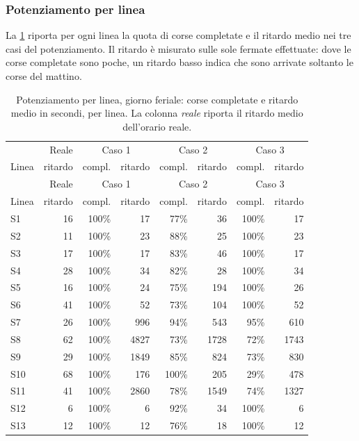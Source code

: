 \subsubsection{Potenziamento per linea}
La \cref{tab:linee-potenziamento} riporta per ogni linea la quota di corse completate e il ritardo medio nei tre casi del potenziamento. Il ritardo è misurato sulle sole fermate effettuate: dove le corse completate sono poche, un ritardo basso indica che sono arrivate soltanto le corse del mattino.

{\small
\begin{longtable}{@{}lrrrrrrr@{}}
	\caption{Potenziamento per linea, giorno feriale: corse completate e ritardo medio in secondi, per linea. La colonna \emph{reale} riporta il ritardo medio dell'orario reale.}\label{tab:linee-potenziamento}\\
	\toprule
	 & Reale & \multicolumn{2}{c}{Caso 1} & \multicolumn{2}{c}{Caso 2} & \multicolumn{2}{c}{Caso 3} \\
	Linea & ritardo & compl. & ritardo & compl. & ritardo & compl. & ritardo \\
	\midrule
	\endfirsthead
	\toprule
	 & Reale & \multicolumn{2}{c}{Caso 1} & \multicolumn{2}{c}{Caso 2} & \multicolumn{2}{c}{Caso 3} \\
	Linea & ritardo & compl. & ritardo & compl. & ritardo & compl. & ritardo \\
	\midrule
	\endhead
	S1 & 16 & 100\% & 17 & 77\% & 36 & 100\% & 17 \\
	S2 & 11 & 100\% & 23 & 88\% & 25 & 100\% & 23 \\
	S3 & 17 & 100\% & 17 & 83\% & 46 & 100\% & 17 \\
	S4 & 28 & 100\% & 34 & 82\% & 28 & 100\% & 34 \\
	S5 & 16 & 100\% & 24 & 75\% & 194 & 100\% & 26 \\
	S6 & 41 & 100\% & 52 & 73\% & 104 & 100\% & 52 \\
	S7 & 26 & 100\% & 996 & 94\% & 543 & 95\% & 610 \\
	S8 & 62 & 100\% & 4827 & 73\% & 1728 & 72\% & 1743 \\
	S9 & 29 & 100\% & 1849 & 85\% & 824 & 73\% & 830 \\
	S10 & 68 & 100\% & 176 & 100\% & 205 & 29\% & 478 \\
	S11 & 41 & 100\% & 2860 & 78\% & 1549 & 74\% & 1327 \\
	S12 & 6 & 100\% & 6 & 92\% & 34 & 100\% & 6 \\
	S13 & 12 & 100\% & 12 & 76\% & 18 & 100\% & 12 \\

\end{longtable}}
